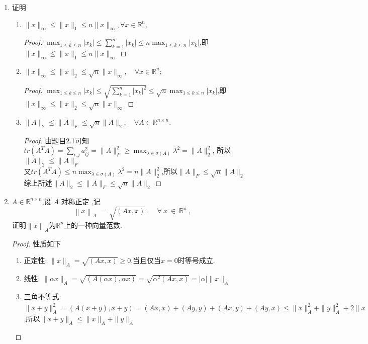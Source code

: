 \documentclass[a4paper]{article}
\begin{document}
\begin{enumerate}
  \item 证明
  \begin{enumerate}[label=（\arabic*）]
    \item $\| x \|_\infty \leqslant \| x \|_1 \leqslant n \| x \|_\infty, \forall x \in \mathbb{R}^n,$
    \begin{proof}
      $\max_{1\leq k\leq n}|x_k|\le \sum_{k=1}^n|x_k| \le n\max_{1\leq k\leq n}|x_k|$,即$\| x \|_\infty \leqslant \| x \|_1 \leqslant n \| x \|_\infty$
    \end{proof}
    \item $\| x \|_{\infty} \leqslant \| x \|_{2} \leqslant \sqrt{n} \| x \|_{\infty}, \quad \forall x \in \mathbb{R}^{n};$
    \begin{proof}
      $\max_{1\leq k\leq n}|x_k|\le \sqrt{\sum_{k=1}^n|x_k|^2} \le \sqrt{n}\max_{1\leq k\leq n}|x_k|$,即$\| x \|_{\infty} \leqslant \| x \|_{2} \leqslant \sqrt{n} \| x \|_{\infty}$
    \end{proof}
    \item $\|A\|_2 \leqslant \|A\|_F \leqslant \sqrt{n} \|A\|_2, \quad \forall A \in \mathbb{R}^{n \times n}.$
    \begin{proof}
      由题目2.1可知$tr(A^TA)=\sum_{i,j}a_{ij}^2=\|A\|_F^2\ge \max_{\lambda\in\sigma(A)}\lambda^2=\|A\|_{2}^2$, 所以$\|A\|_{2}\le\|A\|_{F}$\\
      又$tr(A^TA)\le n\max_{\lambda\in\sigma(A)}\lambda^2=n\|A\|_{2}^2$,所以$\|A\|_{F}\le \sqrt{n}\|A\|_{2}$\\
      综上所述$\|A\|_2 \leqslant \|A\|_F \leqslant \sqrt{n} \|A\|_2$
    \end{proof}
  \end{enumerate}

  \item $A\in \mathbb{R} ^{n\times n}$,设 $A$ 对称正定 ,记
  $$\left\|x\right\|_A\:=\:\sqrt{\left(Ax,x\right)}\:,\quad\forall\:x\:\in\:\mathbb{R}^n\:,$$
  证明$\left\|x\right\|_A$为$\mathbb{R}^n$上的一种向量范数.
  \begin{proof}
    性质如下
    \begin{enumerate}[label=（\roman*）]
      \item 正定性: $\|x\|_A=\sqrt{(Ax,x)}\ge0$,当且仅当$x=0$时等号成立.
      \item 线性: $\|\alpha x\|_A=\sqrt{(A(\alpha x),\alpha x)}=\sqrt{\alpha^2(Ax,x)}=|\alpha|\|x\|_A$
      \item 三角不等式: $\|x+y\|_A^2=(A(x+y),x+y)=(Ax,x)+(Ay,y)+(Ax,y)+(Ay,x)\le \|x\|_A^2+\|y\|_A^2+2\|x\|_A\|y\|_A=(\|x\|_A+\|y\|_A)^2$,所以$\|x+y\|_A\le \|x\|_A+\|y\|_A$
    \end{enumerate}
  \end{proof}
  

\end{enumerate}
\end{document}
